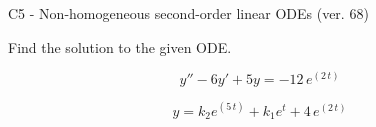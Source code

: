 \begin{exercise}
  \begin{exerciseTitle}C5 - Non-homogeneous second-order linear ODEs (ver. 68)\end{exerciseTitle}
  \begin{exerciseStatement}
    
Find the solution to the given ODE.

    
\[y''-6y'+5y = -12 \, e^{\left(2 \, t\right)}\]

  \end{exerciseStatement}
  \begin{exerciseAnswer}
    
\[y= k_{2} e^{\left(5 \, t\right)} + k_{1} e^{t} + 4 \, e^{\left(2 \, t\right)}\]

  \end{exerciseAnswer}
\end{exercise}